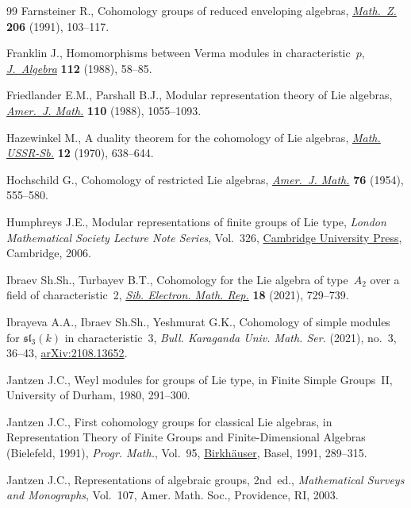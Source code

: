 \begin{thebibliography}{99}
Farnsteiner R., Cohomology groups of reduced enveloping algebras,
 \href{https://doi.org/10.1007/BF02571329}{\textit{Math.~Z.}} \textbf{206} (1991), 103--117.

Franklin J., Homomorphisms between {V}erma modules in characteristic~{$p$},
 \href{https://doi.org/10.1016/0021-8693(88)90132-9}{\textit{J.~Algebra}} \textbf{112} (1988), 58--85.

Friedlander E.M., Parshall B.J., Modular representation theory of {L}ie
 algebras, \href{https://doi.org/10.2307/2374686}{\textit{Amer.~J. Math.}} \textbf{110} (1988), 1055--1093.

Hazewinkel M., A duality theorem for the cohomology of Lie algebras,
 \href{https://doi.org/10.1070/SM1970v012n04ABEH000942}{\textit{Math. USSR-Sb.}} \textbf{12} (1970), 638--644.

Hochschild G., Cohomology of restricted {L}ie algebras, \href{https://doi.org/10.2307/2372701}{\textit{Amer.~J. Math.}}
 \textbf{76} (1954), 555--580.

Humphreys J.E., Modular representations of finite groups of {L}ie type,
 \textit{London Mathematical Society Lecture Note Series}, Vol.~326, \href{https://doi.org/10.1017/CBO9780511525940}{Cambridge
 University Press}, Cambridge, 2006.

Ibraev Sh.Sh., Turbayev B.T., Cohomology for the {L}ie algebra of type~{$A_2$}
 over a field of characteristic~2, \href{https://doi.org/10.33048/semi.2021.18.053}{\textit{Sib. Electron. Math. Rep.}}
 \textbf{18} (2021), 729--739.

Ibrayeva A.A., Ibraev Sh.Sh., Yeshmurat G.K., Cohomology of simple modules for
 $\mathfrak{sl}_3(k)$ in characteristic~$3$, \textit{Bull. Karaganda Univ. Math. Ser.} (2021), no.~3, 36--43, \href{https://arxiv.org/abs/2108.13652}{arXiv:2108.13652}.

Jantzen J.C., Weyl modules for groups of {L}ie type, in Finite Simple
 Groups~{II}, University of Durham, 1980, 291--300.

Jantzen J.C., First cohomology groups for classical {L}ie algebras, in
 Representation Theory of Finite Groups and Finite-Dimensional Algebras
 ({B}ielefeld, 1991), \textit{Progr. Math.}, Vol.~95, \href{https://doi.org/10.1007/978-3-0348-8658-1_11}{Birkh\"auser}, Basel,
 1991, 289--315.

Jantzen J.C., Representations of algebraic groups, 2nd~ed., \textit{Mathematical Surveys
 and Monographs}, Vol.~107, Amer. Math. Soc., Providence, RI, 2003.


\end{thebibliography}
